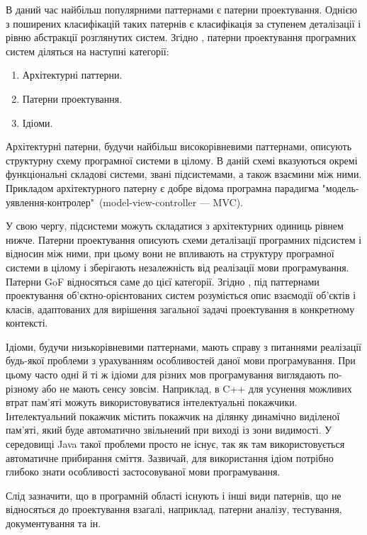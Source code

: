 \documentclass[../main.tex]{subfiles}
\begin{document}
В даний час найбільш популярними паттернами є патерни проектування. Однією з поширених класифікацій таких патернів є класифікація за ступенем деталізації і рівню абстракції розглянутих систем. Згідно \cite{pattern_oriented_arch}, патерни проектування програмних систем діляться на наступні категорії:

\begin{enumerate}
	\item Архітектурні паттерни.
	\item Патерни проектування.
	\item Ідіоми.
\end{enumerate}

Архітектурні патерни, будучи найбільш високорівневими паттернами, описують структурну схему програмної системи в цілому. В даній схемі вказуються окремі функціональні складові системи, звані підсистемами, а також взаємини між ними. Прикладом архітектурного патерну є добре відома програмна парадигма "модель-уявлення-контролер"\ (model-view-controller — MVC).

У свою чергу, підсистеми можуть складатися з архітектурних одиниць рівнем нижче. Патерни проектування описують схеми деталізації програмних підсистем і відносин між ними, при цьому вони не впливають на структуру програмної системи в цілому і зберігають незалежність від реалізації мови програмування. Патерни GoF відносяться саме до цієї категорії. Згідно \cite{gof}, під паттернами проектування об'єктно-орієнтованих систем розуміється опис взаємодії об'єктів і класів, адаптованих для вирішення загальної задачі проектування в конкретному контексті.

Ідіоми, будучи низькорівневими паттернами, мають справу з питаннями реалізації будь-якої проблеми з урахуванням особливостей даної мови програмування. При цьому часто одні й ті ж ідіоми для різних мов програмування виглядають по-різному або не мають сенсу зовсім. Наприклад, в C++ для усунення можливих втрат пам'яті можуть використовуватися інтелектуальні покажчики. Інтелектуальний покажчик містить покажчик на ділянку динамічно виділеної пам'яті, який буде автоматично звільнений при виході із зони видимості. У середовищі Java такої проблеми просто не існує, так як там використовується автоматичне прибирання сміття. Зазвичай, для використання ідіом потрібно глибоко знати особливості застосовуваної мови програмування.

Слід зазначити, що в програмній області існують і інші види патернів, що не відносяться до проектування взагалі, наприклад, патерни аналізу, тестування, документування та ін.
\end{document}
